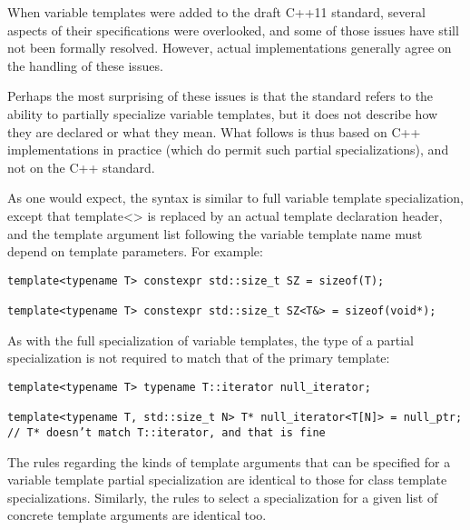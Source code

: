 When variable templates were added to the draft C++11 standard, several aspects of their specifications were overlooked, and some of those issues have still not been formally resolved. However, actual implementations generally agree on the handling of these issues.

Perhaps the most surprising of these issues is that the standard refers to the ability to partially specialize variable templates, but it does not describe how they are declared or what they mean. What follows is thus based on C++ implementations in practice (which do permit such partial specializations), and not on the C++ standard.

As one would expect, the syntax is similar to full variable template specialization, except that template<> is replaced by an actual template declaration header, and the template argument list following the variable template name must depend on template parameters. For example:

\begin{lstlisting}[style=styleCXX]
template<typename T> constexpr std::size_t SZ = sizeof(T);

template<typename T> constexpr std::size_t SZ<T&> = sizeof(void*);
\end{lstlisting}

As with the full specialization of variable templates, the type of a partial specialization is not required to match that of the primary template:

\begin{lstlisting}[style=styleCXX]
template<typename T> typename T::iterator null_iterator;

template<typename T, std::size_t N> T* null_iterator<T[N]> = null_ptr;
// T* doesn’t match T::iterator, and that is fine
\end{lstlisting}

The rules regarding the kinds of template arguments that can be specified for a variable template partial specialization are identical to those for class template specializations. Similarly, the rules to select a specialization for a given list of concrete template arguments are identical too.




































